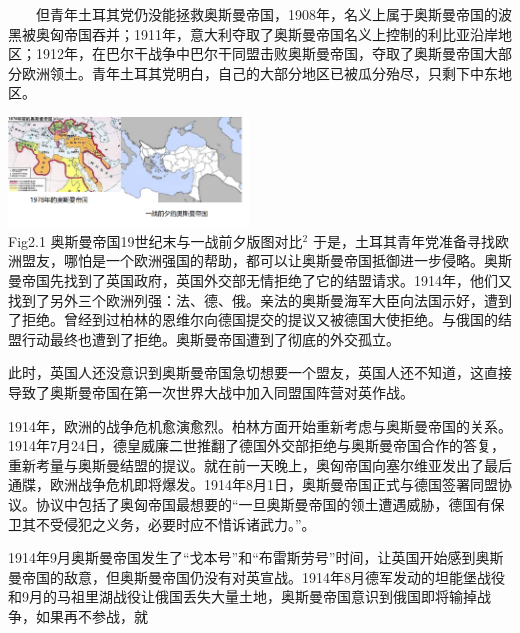 \documentclass{article}
\begin{document}
\begin{flushleft}
    \justifying
    \ \ \ \ 但青年土耳其党仍没能拯救奥斯曼帝国，1908年，名义上属于奥斯曼帝国的波黑被奥匈帝国吞并；1911年，意大利夺取了奥斯曼帝国名义上控制的利比亚沿岸地区；1912年，在巴尔干战争中巴尔干同盟击败奥斯曼帝国，夺取了奥斯曼帝国大部分欧洲领土。青年土耳其党明白，自己的大部分地区已被瓜分殆尽，只剩下中东地区。
\end{flushleft}
\centering\includegraphics[width=6.4cm]{em.png}\\
\centering {} Fig2.1 奥斯曼帝国19世纪末与一战前夕版图对比$^2$\clearpage
\justifying
于是，土耳其青年党准备寻找欧洲盟友，哪怕是一个欧洲强国的帮助，都可以让奥斯曼帝国抵御进一步侵略。奥斯曼帝国先找到了英国政府，英国外交部无情拒绝了它的结盟请求。1914年，他们又找到了另外三个欧洲列强：法、德、俄。亲法的奥斯曼海军大臣向法国示好，遭到了拒绝。曾经到过柏林的恩维尔向德国提交的提议又被德国大使拒绝。与俄国的结盟行动最终也遭到了拒绝。奥斯曼帝国遭到了彻底的外交孤立。

此时，英国人还没意识到奥斯曼帝国急切想要一个盟友，英国人还不知道，这直接导致了奥斯曼帝国在第一次世界大战中加入同盟国阵营对英作战。

1914年，欧洲的战争危机愈演愈烈。柏林方面开始重新考虑与奥斯曼帝国的关系。1914年7月24日，德皇威廉二世推翻了德国外交部拒绝与奥斯曼帝国合作的答复，重新考量与奥斯曼结盟的提议。就在前一天晚上，奥匈帝国向塞尔维亚发出了最后通牒，欧洲战争危机即将爆发。1914年8月1日，奥斯曼帝国正式与德国签署同盟协议。协议中包括了奥匈帝国最想要的“一旦奥斯曼帝国的领土遭遇威胁，德国有保卫其不受侵犯之义务，必要时应不惜诉诸武力。”。

1914年9月奥斯曼帝国发生了“戈本号”和“布雷斯劳号”时间，让英国开始感到奥斯曼帝国的敌意，但奥斯曼帝国仍没有对英宣战。1914年8月德军发动的坦能堡战役和9月的马祖里湖战役让俄国丢失大量土地，奥斯曼帝国意识到俄国即将输掉战争，如果再不参战，就
\clearpage
\end{document}
